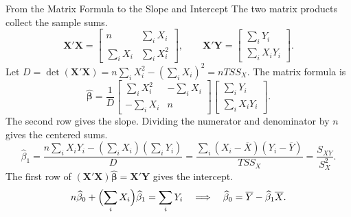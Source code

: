 \documentclass[10pt,aspectratio=169]{beamer}
\begin{document}
\begin{frame}{From the Matrix Formula to the Slope and Intercept}
\small
The two matrix products collect the sample sums.
\[
\mathbf X'\mathbf X
=\begin{bmatrix}n&\sum_i X_i\\ \sum_i X_i&\sum_i X_i^2\end{bmatrix},
\qquad
\mathbf X'\mathbf Y
=\begin{bmatrix}\sum_i Y_i\\ \sum_i X_iY_i\end{bmatrix}.
\]
Let $D=\det(\mathbf X'\mathbf X)=n\sum_i X_i^2-(\sum_i X_i)^2=nTSS_X$. The matrix formula is
\[
\widehat{\boldsymbol{\beta}}
=\frac1D
\begin{bmatrix}\sum_i X_i^2&-\sum_i X_i\\ -\sum_i X_i&n\end{bmatrix}
\begin{bmatrix}\sum_i Y_i\\ \sum_i X_iY_i\end{bmatrix}.
\]
The second row gives the slope. Dividing the numerator and denominator by $n$ gives the centered sums.
\[
\widehat\beta_1
=\frac{n\sum_i X_iY_i-(\sum_i X_i)(\sum_i Y_i)}{D}
=\frac{\sum_i(X_i-\overline X)(Y_i-\overline Y)}{TSS_X}
=\frac{S_{XY}}{S_X^2}.
\]
The first row of $(\mathbf X'\mathbf X)\widehat{\boldsymbol{\beta}}=\mathbf X'\mathbf Y$ gives the intercept.
\[
n\widehat\beta_0+\Bigl(\sum_i X_i\Bigr)\widehat\beta_1=\sum_i Y_i
\quad\Longrightarrow\quad
\widehat\beta_0=\overline Y-\widehat\beta_1\overline X.
\]
\end{frame}
\end{document}
